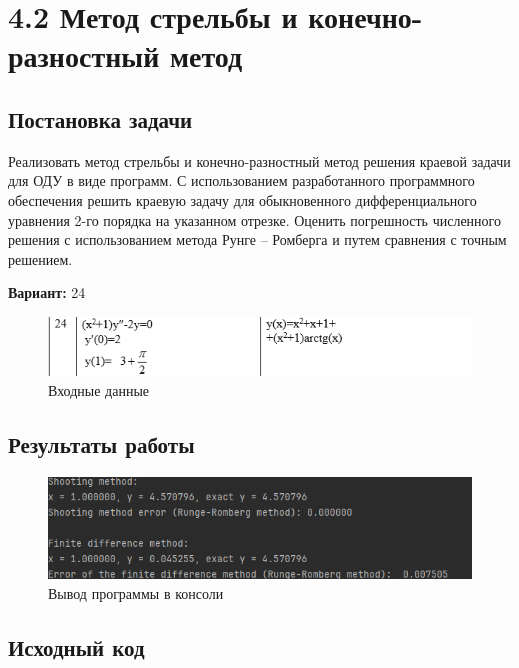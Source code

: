 \pagebreak

\section* {4.2 Метод стрельбы и конечно-разностный метод}

\subsection{Постановка задачи}
Реализовать метод стрельбы и конечно-разностный метод решения краевой задачи для ОДУ в виде программ. С использованием разработанного программного обеспечения решить краевую задачу для обыкновенного дифференциального уравнения 2-го порядка на указанном отрезке. Оценить погрешность численного решения с использованием метода Рунге – Ромберга и путем сравнения с точным решением. 

{\bfseries Вариант:} 24

\begin{figure}[h!]
\centering
\includegraphics[width=.9\textwidth]{img/task4_2.png}
\caption{Входные данные}
\end{figure}

\subsection{Результаты работы}
\begin{figure}[h!]
\centering
\includegraphics[width=.9\textwidth]{img/lab4_2_res.png}
\caption{Вывод программы в консоли}
\end{figure}

\pagebreak

\subsection{Исходный код}








